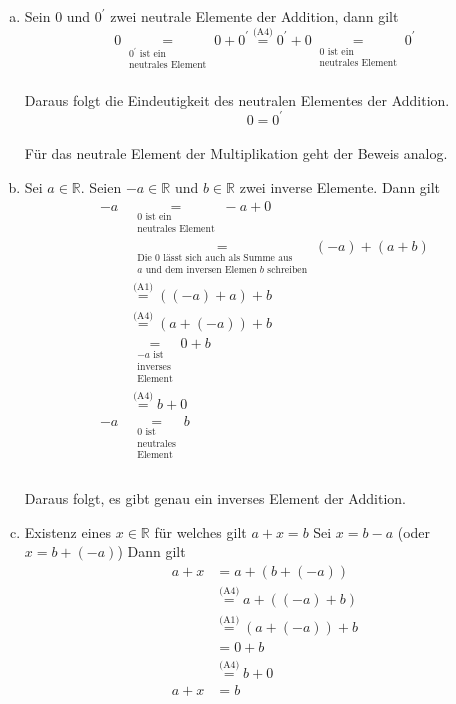 \documentclass{article}
\begin{document}
\begin{enumerate}[(a)]
\item Sein $0$ und $0^{\prime}$ zwei neutrale Elemente der Addition, dann gilt
  \[
    0 \underset{\substack{0^{\prime} \text{ ist ein} \\ \text{neutrales Element}}}=
    0 + 0^{\prime} \overset{\text{(A4)}}=
    0^{\prime} + 0 \underset{\substack{0 \text{ ist ein} \\ \text{neutrales Element}}}= 0^{\prime}
  \]
  \\
  Daraus folgt die Eindeutigkeit des neutralen Elementes der Addition.
  \[
    0 = 0^{\prime}
  \]
  \\
  Für das neutrale Element der Multiplikation geht der Beweis analog.
\item Sei $a \in \mathbb{R}$. Seien $-a \in \mathbb{R}$ und $b \in \mathbb{R}$ zwei inverse Elemente.
  Dann gilt
  \begin{align*}
    -a &\underset{\substack{0 \text{ ist ein} \\ \text{neutrales Element}}}=-a + 0 \\
     &\underset{
       \substack{
         \text{Die } 0 \text{ lässt sich auch als Summe aus} \\
         a \text{ und dem inversen Elemen } b \text{ schreiben}
       }
    }= (-a) + (a + b) \\
    &\overset{\text{(A1)}}= ((-a) + a) + b \\
    &\overset{\text{(A4)}}= (a + (-a)) + b \\
    &\underset{
      \substack{
        -a \text{ ist} \\
        \text{inverses} \\
        \text{Element}
      }
    }= 0 + b \\
    &\overset{\text{(A4)}}= b + 0 \\
    -a &\underset{
      \substack{
        0 \text{ ist} \\
        \text{neutrales} \\
        \text{Element}
      }
    }= b \\   
  \end{align*}
  \\
  Daraus folgt, es gibt genau ein inverses Element der Addition.
\item Existenz eines $x \in \mathbb{R}$ für welches gilt $a + x = b$
  Sei $x = b - a$ (oder $x = b + (-a)$)
  Dann gilt
  \begin{align*}
    a + x &= a + (b + (-a)) \\
          &\overset{\text{(A4)}}= a + ((-a) + b) \\
          &\overset{\text{(A1)}}= (a + (-a)) + b \\
          &= 0 + b \\
          &\overset{\text{(A4)}}= b + 0 \\
    a + x &= b 
  \end{align*}


\end{enumerate}
\end{document}

